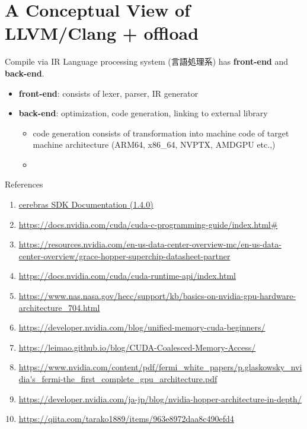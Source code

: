 \documentclass[dvipdfmx, 11pt, aspectratio=169]{beamer}   %
\begin{document}
\section{A Conceptual View of LLVM/Clang + offload}
\begin{frame}{Compile via IR}
Language processing system (言語処理系) has \textbf{front-end} and \textbf{back-end}.
\begin{itemize}
    \item \textbf{front-end}: consists of lexer, parser, IR generator
    \item \textbf{back-end}: optimization, code generation, linking to external library
    \begin{itemize}
        \item code generation consists of transformation into machine code of target machine architecture (ARM64, x86\_64, NVPTX, AMDGPU etc.,)
        \item 
    \end{itemize}
\end{itemize}

\end{frame}
\begin{frame}[fragile]{References}
  \begin{enumerate}\footnotesize
    \item \href{https://sdk.cerebras.net/computing-with-cerebras#}{cerebras SDK Documentation (1.4.0)}
    \item \url{https://docs.nvidia.com/cuda/cuda-c-programming-guide/index.html#}
    \item \url{https://resources.nvidia.com/en-us-data-center-overview-mc/en-us-data-center-overview/grace-hopper-superchip-datasheet-partner}
    \item \url{https://docs.nvidia.com/cuda/cuda-runtime-api/index.html}
    \item \url{https://www.nas.nasa.gov/hecc/support/kb/basics-on-nvidia-gpu-hardware-architecture_704.html}
    \item \url{https://developer.nvidia.com/blog/unified-memory-cuda-beginners/}
    \item \url{https://leimao.github.io/blog/CUDA-Coalesced-Memory-Access/}
    \item \url{https://www.nvidia.com/content/pdf/fermi_white_papers/p.glaskowsky_nvidia's_fermi-the_first_complete_gpu_architecture.pdf}
    \item \url{https://developer.nvidia.com/ja-jp/blog/nvidia-hopper-architecture-in-depth/}
    \item \url{https://qiita.com/tarako1889/items/963e8972daa8c490efd4}
  \end{enumerate}
\end{frame}
\end{document}
